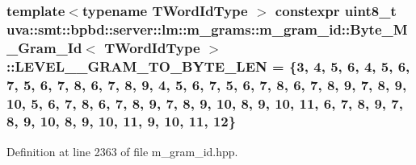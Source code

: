 \subsubsection[{L\+E\+V\+E\+L\+\_\+3\+\_\+\+G\+R\+A\+M\+\_\+\+T\+O\+\_\+\+B\+Y\+T\+E\+\_\+\+L\+E\+N}]{\setlength{\rightskip}{0pt plus 5cm}template$<$typename T\+Word\+Id\+Type $>$ constexpr uint8\+\_\+t {\bf uva\+::smt\+::bpbd\+::server\+::lm\+::m\+\_\+grams\+::m\+\_\+gram\+\_\+id\+::\+Byte\+\_\+\+M\+\_\+\+Gram\+\_\+\+Id}$<$ T\+Word\+Id\+Type $>$\+::L\+E\+V\+E\+L\+\_\+\_\+\+G\+R\+A\+M\+\_\+\+T\+O\+\_\+\+B\+Y\+T\+E\+\_\+\+L\+E\+N = \{3, 4, 5, 6, 4, 5, 6, 7, 5, 6, 7, 8, 6, 7, 8, 9, 4, 5, 6, 7, 5, 6, 7, 8, 6, 7, 8, 9, 7, 8, 9, 10, 5, 6, 7, 8, 6, 7, 8, 9, 7, 8, 9, 10, 8, 9, 10, 11, 6, 7, 8, 9, 7, 8, 9, 10, 8, 9, 10, 11, 9, 10, 11, 12\}\hspace{0.3cm}{\ttfamily [static]}}\label{classuva_1_1smt_1_1bpbd_1_1server_1_1lm_1_1m__grams_1_1m__gram__id_1_1_byte___m___gram___id_a3cd411cdeda61989f2061a4d7b4b5e2e}


Definition at line 2363 of file m\+\_\+gram\+\_\+id.\+hpp.

\hypertarget{classuva_1_1smt_1_1bpbd_1_1server_1_1lm_1_1m__grams_1_1m__gram__id_1_1_byte___m___gram___id_abae28df1e61ace6a2076025e9adede10}{}
